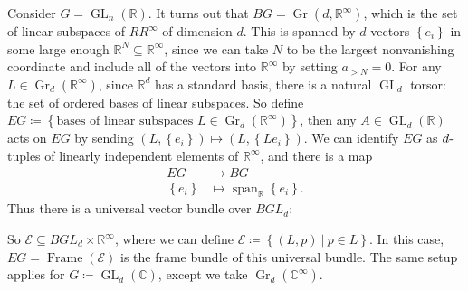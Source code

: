 \begin{example}[?]

Consider \(G = \operatorname{GL}_n({\mathbb{R}})\). It turns out that
\(BG = {\operatorname{Gr}}(d, {\mathbb{R}}^{\infty })\), which is the
set of linear subspaces of \(RR^{\infty }\) of dimension \(d\). This is
spanned by \(d\) vectors \(\left\{{e_ i}\right\}\) in some large enough
\({\mathbb{R}}^N \subseteq {\mathbb{R}}^{\infty }\), since we can take
\(N\) to be the largest nonvanishing coordinate and include all of the
vectors into \({\mathbb{R}}^{\infty }\) by setting \(a_{> N} = 0\). For
any \(L \in {\operatorname{Gr}}_d({\mathbb{R}}^{\infty })\), since
\({\mathbb{R}}^d\) has a standard basis, there is a natural
\(\operatorname{GL}_d\) torsor: the set of ordered bases of linear
subspaces. So define
\(EG \coloneqq\left\{{ \text{bases of linear subspaces } L \in {\operatorname{Gr}}_d({\mathbb{R}}^{\infty }) }\right\}\),
then any \(A\in \operatorname{GL}_d({\mathbb{R}})\) acts on \(EG\) by
sending
\((L, \left\{{e_i}\right\}) \mapsto (L, \left\{{ Le_i}\right\} )\). We
can identify \(EG\) as \(d{\hbox{-}}\)tuples of linearly independent
elements of \({\mathbb{R}}^{\infty }\), and there is a map
\begin{align*}
EG &\to BG \\
\left\{{e_i}\right\} &\mapsto {\operatorname{span}}_{\mathbb{R}}\left\{{e_i}\right\}
.\end{align*}
Thus there is a universal vector bundle over \(BGL_d\):

\begin{center}
\end{center}

So \(\mathcal{E} \subseteq BGL_d \times{\mathbb{R}}^{\infty }\), where
we can define
\(\mathcal{E} \coloneqq\left\{{(L, p) {~\mathrel{\Big|}~}p\in L}\right\}\).
In this case, \(EG = {\operatorname{Frame}}( \mathcal{E})\) is the frame
bundle of this universal bundle. The same setup applies for
\(G \coloneqq\operatorname{GL}_d({\mathbb{C}})\), except we take
\({\operatorname{Gr}}_d({\mathbb{C}}^{\infty })\).

\end{example}

